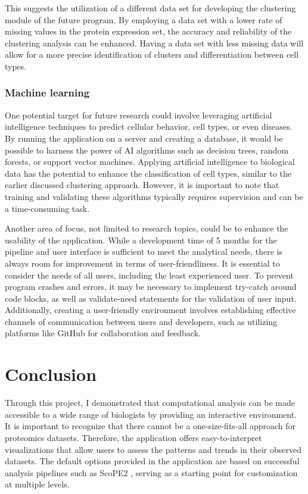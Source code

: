 \documentclass[
  11pt,
]{article}
\begin{document}
This suggests the utilization of a different data set for developing the
clustering module of the future program. By employing a data set with a
lower rate of missing values in the protein expression set, the accuracy
and reliability of the clustering analysis can be enhanced. Having a
data set with less missing data will allow for a more precise
identification of clusters and differentiation between cell types.

\hypertarget{machine-learning}{%
\subsubsection{Machine learning}\label{machine-learning}}

One potential target for future research could involve leveraging
artificial intelligence techniques to predict cellular behavior, cell
types, or even diseases. By running the application on a server and
creating a database, it would be possible to harness the power of AI
algorithms such as decision trees, random forests, or support vector
machines. Applying artificial intelligence to biological data has the
potential to enhance the classification of cell types, similar to the
earlier discussed clustering approach. However, it is important to note
that training and validating these algorithms typically requires
supervision and can be a time-consuming task.

Another area of focus, not limited to research topics, could be to
enhance the usability of the application. While a development time of 5
months for the pipeline and user interface is sufficient to meet the
analytical needs, there is always room for improvement in terms of
user-friendliness. It is essential to consider the needs of all users,
including the least experienced user. To prevent program crashes and
errors, it may be necessary to implement try-catch around code blocks,
as well as validate-need statements for the validation of user input.
Additionally, creating a user-friendly environment involves establishing
effective channels of communication between users and developers, such
as utilizing platforms like GitHub for collaboration and feedback.

\newpage

\hypertarget{conclusion}{%
\section{Conclusion}\label{conclusion}}

Through this project, I demonstrated that computational analysis can be
made accessible to a wide range of biologists by providing an
interactive environment. It is important to recognize that there cannot
be a one-size-fits-all approach for proteomics datasets. Therefore, the
application offers easy-to-interpret visualizations that allow users to
assess the patterns and trends in their observed datasets. The default
options provided in the application are based on successful analysis
pipelines such as ScoPE2 \citep{Specht2021}, serving as a starting point
for customization at multiple levels.
\end{document}
